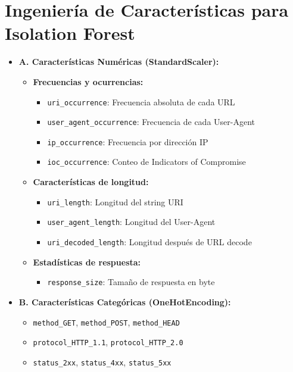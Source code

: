 \documentclass[12pt]{article}
\begin{document}
	\section{Ingeniería de Características para Isolation Forest}
	\begin{itemize}
		\item \textbf{A. Características Numéricas (StandardScaler):}
		\begin{itemize}
			\item \textbf{Frecuencias y ocurrencias:}
			\begin{itemize}
				\item \texttt{uri\_occurrence}: Frecuencia absoluta de cada URL
				\item \texttt{user\_agent\_occurrence}: Frecuencia de cada User-Agent
				\item \texttt{ip\_occurrence}: Frecuencia por dirección IP
				\item \texttt{ioc\_occurrence}: Conteo de Indicators of Compromise
			\end{itemize}
			
			\item \textbf{Características de longitud:}
			\begin{itemize}
				\item \texttt{uri\_length}: Longitud del string URI
				\item \texttt{user\_agent\_length}: Longitud del User-Agent
				\item \texttt{uri\_decoded\_length}: Longitud después de URL decode
			\end{itemize}
			
	
			
			\item \textbf{Estadísticas de respuesta:}
			\begin{itemize}
				\item \texttt{response\_size}: Tamaño de respuesta en byte
			\end{itemize}
		\end{itemize}
		
		\item \textbf{B. Características Categóricas (OneHotEncoding):}
		\begin{itemize}
			\item \texttt{method\_GET}, \texttt{method\_POST}, \texttt{method\_HEAD}
			\item \texttt{protocol\_HTTP\_1.1}, \texttt{protocol\_HTTP\_2.0}
			\item \texttt{status\_2xx}, \texttt{status\_4xx}, \texttt{status\_5xx}
		\end{itemize}
	\end{itemize}
	
\end{document}
